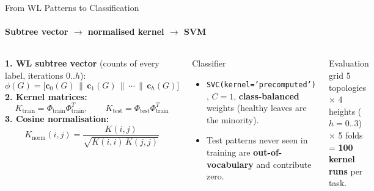 \documentclass[aspectratio=169, 11pt]{beamer}
\begin{document}
\begin{frame}{From WL Patterns to Classification}
    \framesubtitle{Subtree vector $\rightarrow$ normalised kernel $\rightarrow$ SVM \cite{shervashidze2011weisfeiler, scholkopf2002learning, cortes1995support}}
    \begin{columns}[T]
        \scriptsize
        \textbf{1. WL subtree vector} (counts of every label, iterations $0..h$):
        \[ \phi(G) = \big[\mathbf{c}_0(G) \,\|\, \mathbf{c}_1(G) \,\|\, \cdots \,\|\, \mathbf{c}_h(G)\big] \]
        \textbf{2. Kernel matrices:}
        \[ K_{\text{train}} = \Phi_{\text{train}}\Phi_{\text{train}}^{T}, \qquad K_{\text{test}} = \Phi_{\text{test}}\Phi_{\text{train}}^{T} \]
        \textbf{3. Cosine normalisation:}
        \[ K_{\text{norm}}(i,j) = \frac{K(i,j)}{\sqrt{K(i,i)\,K(j,j)}} \]

        \begin{block}{Classifier}
            \scriptsize
            \begin{itemize}
                \item \texttt{SVC(kernel='precomputed')} \cite{chang2011libsvm}, $C=1$, \textbf{class-balanced} weights (healthy leaves are the minority).
                \item Test patterns never seen in training are \textbf{out-of-vocabulary} and contribute zero.
            \end{itemize}
        \end{block}
        \begin{block}{Evaluation grid}
            \scriptsize 5 topologies $\times$ 4 heights ($h=0..3$) $\times$ 5 folds = \textbf{100 kernel runs} per task.
        \end{block}
    \end{columns}
\end{frame}
\end{document}
